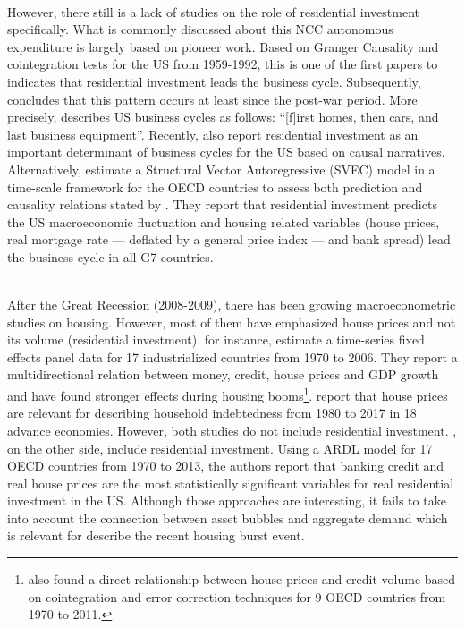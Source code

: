 \documentclass[11pt]{article}
\begin{document}
\\
However, there still is a lack of studies on the role of residential investment specifically.
What is commonly  discussed about this NCC autonomous expenditure is largely based on \textcite{green_follow_1997} pioneer work.
Based on Granger Causality and cointegration tests for the US from 1959-1992, this is one of the first papers to indicates that residential investment leads the business cycle.
Subsequently, \textcite{leamer_housing_2007} concludes that this pattern occurs at least since the post-war period.
More precisely,  \textcite[p.~8]{leamer_housing_2007} describes US business cycles as follows: ``[f]irst homes, then cars,
and last business equipment''.
Recently, \textcites{fiebiger_semi-autonomous_2018}{fiebiger_trend_2017} also report residential investment as an important determinant of business cycles for the US based on causal narratives.
Alternatively, \textcite{huang_is_2020} estimate a Structural Vector Autoregressive (SVEC) model in a time-scale framework for the OECD countries to assess both prediction and causality relations stated by \textcite{leamer_housing_2007}.
They report that residential investment predicts the US  macroeconomic fluctuation and housing related variables (house prices, real mortgage rate --- deflated by a general price index --- and bank spread) lead the business cycle in all G7 countries.

\\
After the Great Recession (2008-2009), there has been growing macroeconometric studies on housing.
However, most of them have emphasized house prices and not its volume (residential investment).
\textcite{goodhart_house_2008} for instance, estimate a time-series fixed effects panel data for 17 industrialized countries from 1970 to 2006. They report a multidirectional relation between money, credit, house prices and GDP growth and have found stronger effects during housing booms\footnote{\textcite{Arestis_Bank_2014} also found a  direct relationship between house prices and credit volume based on cointegration and error correction techniques for 9 OECD countries from 1970 to 2011.}. 
\textcite{wood_house_2020} report that house prices are relevant for describing household indebtedness from 1980 to 2017 in 18 advance economies.
However, both studies do not include residential investment.
\textcite{arestis_residential_2015}, on the other side, include residential investment. Using a ARDL model for 17 OECD countries from 1970 to 2013, the authors report that banking credit and real house prices are the most statistically significant variables for real residential investment in the US.
Although those approaches are interesting, it fails to take into account the connection between asset bubbles and aggregate demand which is relevant for describe the recent housing burst event.
\end{document}
